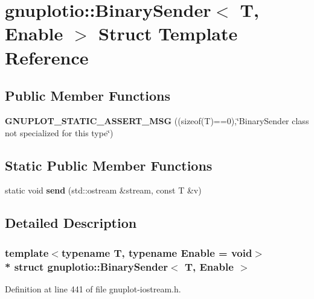 \hypertarget{structgnuplotio_1_1_binary_sender}{}\section{gnuplotio\+:\+:Binary\+Sender$<$ T, Enable $>$ Struct Template Reference}
\label{structgnuplotio_1_1_binary_sender}
\subsection*{Public Member Functions}
\begin{DoxyCompactItemize}
\item 
{\bfseries G\+N\+U\+P\+L\+O\+T\+\_\+\+S\+T\+A\+T\+I\+C\+\_\+\+A\+S\+S\+E\+R\+T\+\_\+\+M\+SG} ((sizeof(T)==0),\char`\"{}Binary\+Sender class not specialized for this type\char`\"{})\hypertarget{structgnuplotio_1_1_binary_sender_a165c59a28adc4a90930925c6e0bfb0a9}{}\label{structgnuplotio_1_1_binary_sender_a165c59a28adc4a90930925c6e0bfb0a9}

\end{DoxyCompactItemize}
\subsection*{Static Public Member Functions}
\begin{DoxyCompactItemize}
\item 
static void {\bfseries send} (std\+::ostream \&stream, const T \&v)\hypertarget{structgnuplotio_1_1_binary_sender_a4b5dd22b7679c4f0ce4d8e75b36c8a21}{}\label{structgnuplotio_1_1_binary_sender_a4b5dd22b7679c4f0ce4d8e75b36c8a21}

\end{DoxyCompactItemize}


\subsection{Detailed Description}
\subsubsection*{template$<$typename T, typename Enable = void$>$\\*
struct gnuplotio\+::\+Binary\+Sender$<$ T, Enable $>$}



Definition at line 441 of file gnuplot-\/iostream.\+h.

